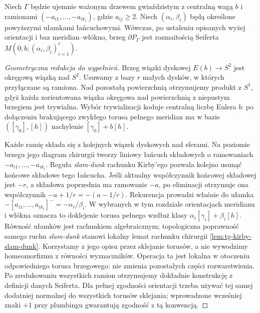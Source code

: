 \begin{twierdzenie}
\label{thm:tg-star-seifert}
Niech $\Gamma$ będzie ujemnie ważonym drzewem
gwiaździstym z centralną wagą $b$ i ramionami
$(-a_{i1},\ldots,-a_{ik_i})$, gdzie $a_{ij}\ge2$.
Niech $(\alpha_i,\beta_i)$ będą określone powyższymi
ułamkami łańcuchowymi. Wówczas, po ustaleniu opisanych
wyżej orientacji i baz meridian--włókno, brzeg
$\partial P_\Gamma$ jest rozmaitością Seiferta
$M(0;b;(\alpha_i,\beta_i)_{i=1}^r)$.
\end{twierdzenie}
\begin{proof}[Geometryczna redukcja do wypełnień]
Brzeg wiązki dyskowej $E(b)\to S^2$ jest okręgową
wiązką nad $S^2$. Usuwamy z bazy $r$ małych dysków,
w których przyłączane są ramiona. Nad pozostałą
powierzchnią otrzymujemy produkt z $S^1$, gdyż
każda zorientowana wiązka okręgowa nad powierzchnią
z niepustym brzegiem jest trywialna. Wybór
trywializacji koduje centralną liczbę Eulera $b$:
po dołączeniu brakującego zwykłego torusa pełnego
meridian ma w bazie $([\gamma_0],[h])$ nachylenie
$[\gamma_0]+b[h]$.

Każde ramię składa się z kolejnych wiązek dyskowych
nad sferami. Na poziomie brzegu jego diagram chirurgii
tworzy liniowy łańcuch składowych o ramowaniach
$-a_{i1},\ldots,-a_{ik_i}$. Reguła \emph{slam-dunk}
rachunku Kirby'ego pozwala kolejno usunąć końcowe
składowe tego łańcucha. Jeśli aktualny współczynnik
końcowej składowej jest $-r$, a składowa poprzednia
ma ramowanie $-a$, po eliminacji otrzymuje ona
współczynnik $-a+1/r=-(a-1/r)$. Rekurencja prowadzi
właśnie do ułamka
$-[a_{i1},\ldots,a_{ik_i}]^-=-\alpha_i/\beta_i$.
W wybranych w tym rozdziale orientacjach meridianu
i włókna oznacza to doklejenie torusa pełnego
wzdłuż klasy $\alpha_i[\gamma_i]+\beta_i[h]$.
Równość ułamków jest rachunkiem algebraicznym;
topologiczna poprawność samego ruchu \emph{slam-dunk}
stanowi lokalny lemat rachunku chirurgii
\ref{lem:tg-kirby-slam-dunk}. Korzystamy z jego opisu
przez sklejanie torusów,
a nie wywodzimy homeomorfizmu z równości wyznaczników.
Operacja ta jest lokalna w otoczeniu odpowiedniego
torusa brzegowego: nie zmienia pozostałych części
rozwarstwienia. Po zredukowaniu wszystkich ramion
otrzymujemy dokładnie konstrukcję z definicji danych
Seiferta. Dla pełnej zgodności orientacji trzeba używać
tej samej dodatniej normalnej do wszystkich torusów
sklejania; wprowadzone wcześniej znaki $+1$ przy
plumbingu gwarantują zgodność z tą konwencją.
\end{proof}

